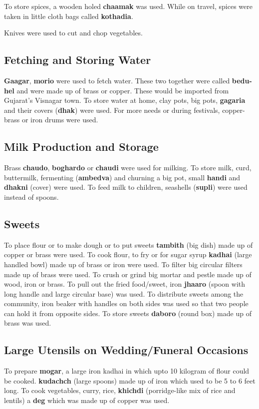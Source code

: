 To store spices, a wooden holed \textbf{chaamak} was used. While on travel,
spices were taken in little cloth bags called \textbf{kothadia}.

Knives were used to cut and chop vegetables.

\subsection{Fetching and Storing Water}
\textbf{Gaagar}, \textbf{morio} were used to fetch water. These two together
were called \textbf{bedu-hel} and were made up of brass or copper. These would
be imported from Gujarat's Visnagar town. To store water at home, clay pots, big
pots, \textbf{gagaria} and their covers (\textbf{dhak}) were used. For more
needs or during festivals, copper-brass or iron drums were used.

\subsection{Milk Production and Storage}
Brass \textbf{chaudo}, \textbf{boghardo} or \textbf{chaudi} were used for
milking. To store milk, curd, buttermilk, fermenting (\textbf{ambedva}) and
churning a big pot, small \textbf{handi} and \textbf{dhakni} (cover) were used.
To feed milk to children, seashells (\textbf{supli}) were used instead of spoons.

\subsection{Sweets}
To place flour or to make dough or to put sweets \textbf{tambith} (big dish)
made up of copper or brass were used.
To cook flour, to fry or for sugar syrup \textbf{kadhai} (large handled bowl)
made up of brass or iron were used.
To filter big circular filters made up of brass were used.
To crush or grind big mortar and pestle made up of wood, iron or brass.
To pull out the fried food/sweet, iron \textbf{jhaaro} (spoon with long handle
and large circular base) was used.
To distribute sweets among the community, iron beaker with handles on both sides
was used so that two people can hold it from opposite sides.
To store sweets \textbf{daboro} (round box) made up of brass was used.

\subsection{Large Utensils on Wedding/Funeral Occasions}
To prepare \textbf{mogar}, a large iron kadhai in which upto 10 kilogram of flour
could be cooked.
\textbf{kudachch} (large spoons) made up of iron which used to be 5 to 6 feet long.
To cook vegetables, curry, rice, \textbf{khichdi} (porridge-like mix of rice and
lentils) a \textbf{deg} which was made up of copper was used.

